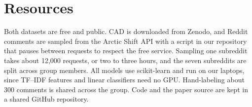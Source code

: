 \documentclass{article}
\begin{document}
\section{Resources}

Both datasets are free and public.
CAD is downloaded from Zenodo, and Reddit comments are sampled from the Arctic Shift API with a script in our repository that pauses between requests to respect the free service.
Sampling one subreddit takes about 12,000 requests, or two to three hours, and the seven subreddits are split across group members.
All models use scikit-learn \citep{pedregosa2011} and run on our laptops, since TF--IDF features and linear classifiers need no GPU.
Hand-labeling about 300 comments is shared across the group.
Code and the paper source are kept in a shared GitHub repository.




\end{document}
